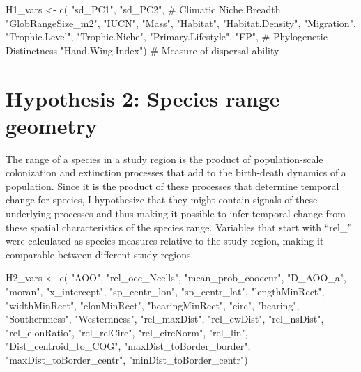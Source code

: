 \documentclass[
  letterpaper,
  DIV=11,
  numbers=noendperiod]{scrreprt}
\newenvironment{Shaded}{\begin{snugshade}}{\end{snugshade}}
\newcommand{\CommentTok}[1]{\textcolor[rgb]{0.37,0.37,0.37}{#1}}
\newcommand{\FunctionTok}[1]{\textcolor[rgb]{0.28,0.35,0.67}{#1}}
\newcommand{\NormalTok}[1]{\textcolor[rgb]{0.00,0.23,0.31}{#1}}
\newcommand{\OtherTok}[1]{\textcolor[rgb]{0.00,0.23,0.31}{#1}}
\newcommand{\StringTok}[1]{\textcolor[rgb]{0.13,0.47,0.30}{#1}}
\begin{document}
\begin{Shaded}
\begin{Highlighting}[]
\NormalTok{H1\_vars }\OtherTok{\textless{}{-}} \FunctionTok{c}\NormalTok{(}
    \StringTok{"sd\_PC1"}\NormalTok{, }\StringTok{"sd\_PC2"}\NormalTok{, }\CommentTok{\# Climatic Niche Breadth}
    \StringTok{"GlobRangeSize\_m2"}\NormalTok{, }\StringTok{"IUCN"}\NormalTok{, }\StringTok{"Mass"}\NormalTok{, }\StringTok{"Habitat"}\NormalTok{, }\StringTok{"Habitat.Density"}\NormalTok{,}
    \StringTok{"Migration"}\NormalTok{, }\StringTok{"Trophic.Level"}\NormalTok{, }\StringTok{"Trophic.Niche"}\NormalTok{, }\StringTok{"Primary.Lifestyle"}\NormalTok{,}
    \StringTok{"FP"}\NormalTok{, }\CommentTok{\# Phylogenetic Distinctness}
    \StringTok{"Hand.Wing.Index"}\NormalTok{) }\CommentTok{\# Measure of dispersal ability}
\end{Highlighting}
\end{Shaded}

\section{Hypothesis 2: Species range geometry}

The range of a species in a study region is the product of
population-scale colonization and extinction processes that add to the
birth-death dynamics of a population. Since it is the product of these
processes that determine temporal change for species, I hypothesize that
they might contain signals of these underlying processes and thus making
it possible to infer temporal change from these spatial characteristics
of the species range. Variables that start with ``rel\_'' were
calculated as species measures relative to the study region, making it
comparable between different study regions.

\begin{Shaded}
\begin{Highlighting}[]
\NormalTok{H2\_vars }\OtherTok{\textless{}{-}} \FunctionTok{c}\NormalTok{(}
    \StringTok{"AOO"}\NormalTok{, }\StringTok{"rel\_occ\_Ncells"}\NormalTok{, }\StringTok{"mean\_prob\_cooccur"}\NormalTok{, }\StringTok{"D\_AOO\_a"}\NormalTok{, }
    \StringTok{"moran"}\NormalTok{, }\StringTok{"x\_intercept"}\NormalTok{, }\StringTok{"sp\_centr\_lon"}\NormalTok{, }\StringTok{"sp\_centr\_lat"}\NormalTok{,}
    \StringTok{"lengthMinRect"}\NormalTok{, }\StringTok{"widthMinRect"}\NormalTok{, }\StringTok{"elonMinRect"}\NormalTok{, }\StringTok{"bearingMinRect"}\NormalTok{,}
    \StringTok{"circ"}\NormalTok{, }\StringTok{"bearing"}\NormalTok{, }\StringTok{"Southernness"}\NormalTok{, }\StringTok{"Westernness"}\NormalTok{,}
    \StringTok{"rel\_maxDist"}\NormalTok{, }\StringTok{"rel\_ewDist"}\NormalTok{, }\StringTok{"rel\_nsDist"}\NormalTok{, }\StringTok{"rel\_elonRatio"}\NormalTok{,}
    \StringTok{"rel\_relCirc"}\NormalTok{, }\StringTok{"rel\_circNorm"}\NormalTok{, }\StringTok{"rel\_lin"}\NormalTok{, }\StringTok{"Dist\_centroid\_to\_COG"}\NormalTok{,}
    \StringTok{"maxDist\_toBorder\_border"}\NormalTok{, }\StringTok{"maxDist\_toBorder\_centr"}\NormalTok{,}
    \StringTok{"minDist\_toBorder\_centr"}\NormalTok{)}
\end{Highlighting}
\end{Shaded}
\end{document}
